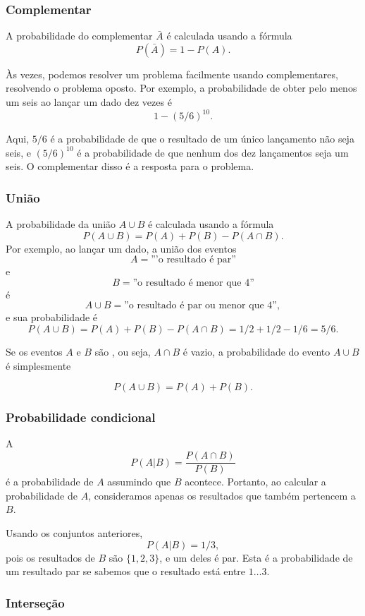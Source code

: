 \subsubsection{Complementar}

A probabilidade do complementar
$\bar A$ é calculada usando a fórmula
\[P(\bar A)=1-P(A).\]

Às vezes, podemos resolver um problema facilmente
usando complementares, resolvendo o problema oposto.
Por exemplo, a probabilidade de obter
pelo menos um seis ao lançar um dado dez vezes é
\[1-(5/6)^{10}.\]

Aqui, $5/6$ é a probabilidade de que o resultado
de um único lançamento não seja seis, e
$(5/6)^{10}$ é a probabilidade de que nenhum dos
dez lançamentos seja um seis.
O complementar disso é a resposta para o problema.

\subsubsection{União}

A probabilidade da união $A \cup B$
é calculada usando a fórmula
\[P(A \cup B)=P(A)+P(B)-P(A \cap B).\]
Por exemplo, ao lançar um dado,
a união dos eventos
\[A=\textrm{'''o resultado é par''}\]
e
\[B=\textrm{''o resultado é menor que 4''}\]
é
\[A \cup B=\textrm{''o resultado é par ou menor que 4''},\]
e sua probabilidade é
\[P(A \cup B) = P(A)+P(B)-P(A \cap B)=1/2+1/2-1/6=5/6.\]


Se os eventos $A$ e $B$ são , ou seja,
$A \cap B$ é vazio,
a probabilidade do evento $A \cup B$ é simplesmente

\[P(A \cup B)=P(A)+P(B).\]

\subsubsection{Probabilidade condicional}


A 
\[P(A | B) = \frac{P(A \cap B)}{P(B)}\]
é a probabilidade de $A$
assumindo que $B$ acontece.
Portanto, ao calcular a
probabilidade de $A$, consideramos apenas os resultados
que também pertencem a $B$.

Usando os conjuntos anteriores,
\[P(A | B)= 1/3,\]
pois os resultados de $B$ são
$\{1,2,3\}$, e um deles é par.
Esta é a probabilidade de um resultado par
se sabemos que o resultado está entre $1 \ldots 3$.

\subsubsection{Interseção}

